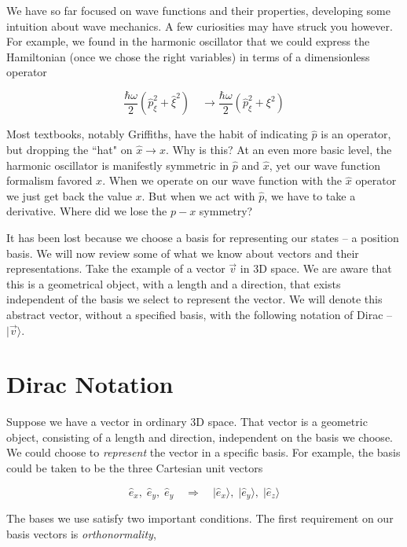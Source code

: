 We have so far focused on wave functions and their properties, developing some
intuition about wave mechanics. A few curiosities may have struck you however.
For example, we found in the harmonic oscillator that we could express the
Hamiltonian (once we chose the right variables) in terms of a dimensionless
operator 

\[
\frac{\hbar\omega}{2} \left( \hat{p}_\xi^2 + \hat{\xi}^2\right)  \quad
\rightarrow \frac{\hbar\omega}{2}\left( \hat{p}_\xi^2 + \xi^2\right)  
\] \vspace{3px}

Most textbooks, notably Griffiths, have the habit of indicating $\hat{p}$ is an
operator, but dropping the ``hat" on $\hat{x} \rightarrow x$. Why is this? At
an even more basic level, the harmonic oscillator is manifestly symmetric in
$\hat{p}$ and $\hat{x}$, yet our wave function formalism favored $x$. When we
operate on our wave function with the $\hat{x}$ operator we just get back the
value $x$. But when we act with $\hat{p}$, we have to take a derivative. Where
did we lose the $p-x$ symmetry? 


It has been lost because we choose a basis for representing our states --
a position basis. We will now review some of what we know about vectors and their representations. Take the example of a
vector $\vec{v}$ in 3D space. We are aware that this is a geometrical object, with a length and a direction, that exists independent of the basis we select to represent the vector. We will denote this abstract
vector, without a specified basis, with the following notation of Dirac -- 
$|\vec{v}\rangle$.

\section{Dirac Notation} 

Suppose we have a vector in ordinary 3D space. That vector is a geometric
object, consisting of a length and direction, independent on the basis we
choose. We could choose to \textit{represent} the vector in a specific basis.
For example, the basis could be taken to be the three Cartesian unit vectors

\[
\hat{e}_x, \; \hat{e}_y, \; \hat{e}_y \quad \Rightarrow \quad | \hat{e}_x
\rangle, \; |\hat{e}_y  \rangle, \; | \hat{e}_z \rangle     
\] \vspace{3px}

The bases we use satisfy two important conditions. The first requirement on our
basis vectors is \textit{orthonormality}, 

